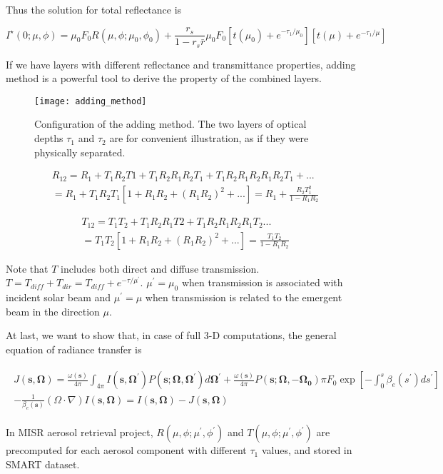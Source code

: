 \begin{appendices}
Thus the solution for total reflectance is

\begin{equation}
   I^\star(0; \mu, \phi) = \mu_0F_0 R(\mu, \phi;\mu_0, \phi_0) + \frac{r_s}{1-r_s\bar{r}} \mu_0 F_0 \left[ t(\mu_0) + e^{-\tau_1/\mu_0} \right] \left[t(\mu) + e^{-\tau_1/\mu}\right]
   \label{equ:surface_solution}
\end{equation}

If we have layers with different reflectance and transmittance properties, adding method is a powerful tool to derive the property of the combined layers.

\begin{figure}[h!]
    \centering
    \texttt{[image: adding\_method]}
    \caption{Configuration of the adding method. The two layers of optical depths $\tau_1$ and $\tau_2$ are for convenient illustration, as if they were physically separated.}
\end{figure}

\begin{multline}
    R_{12} = R_1 + T_1R_2T1 + T_1R_2R_1R_2T_1 + T_1R_2R_1R_2R_1R_2T_1 + ...\\
    = R_1 + T_1R_2T_1\left[1 + R_1R_2 + (R_1R_2)^2 + ...\right] = R_1 + \frac{R_2T_1^2}{1-R_1R_2}
\end{multline}

\begin{multline}
T_{12} = T_1T_2 + T_1R_2R_1T2 + T_1R_2R_1R_2R_1T_2 ...\\
= T_1T_2\left[1 + R_1R_2 + (R_1R_2)^2 + ...\right] = \frac{T_1T_2}{1-R_1R_2}
\end{multline}

Note that $T$ includes both direct and diffuse transmission. $T = T_{diff} + T_{dir} = T_{diff} + e^{-\tau/\mu^\prime}$. $\mu^\prime = \mu_0$ when transmission is associated with incident solar beam and $\mu^\prime = \mu$ when transmission is related to the emergent beam in the direction $\mu$.

At last, we want to show that, in case of full 3-D computations, the general equation of radiance transfer is

\begin{align}
\begin{split}
        J(\mathbf{s, \Omega}) = \frac{\omega(\mathbf{s})}{4\pi}\int_{4\pi}^{} I(\mathbf{s, \Omega^\prime}) P(\mathbf{s}; \mathbf{\Omega, \Omega^\prime}) d\mathbf{\Omega^\prime} + \frac{\omega(\mathbf{s})}{4\pi} P(\mathbf{s}; \mathbf{\Omega, -\Omega_0}) \pi F_0 \exp{\left[ -\int_{0}^{s} \beta_e(s^\prime) ds^\prime \right]} \\
                -\frac{1}{\beta_e(\mathbf{s})} (\Omega \cdot \nabla) I(\mathbf{s, \Omega}) = I(\mathbf{s, \Omega}) - J(\mathbf{s, \Omega})
\end{split}
\end{align}

In MISR aerosol retrieval project, $R(\mu,\phi; \mu^\prime, \phi^\prime)$ and $T(\mu,\phi; \mu^\prime, \phi^\prime)$ are precomputed for each aerosol component with different $\tau_1$ values, and stored in SMART dataset.
\label{apd:rt}
\end{appendices}
